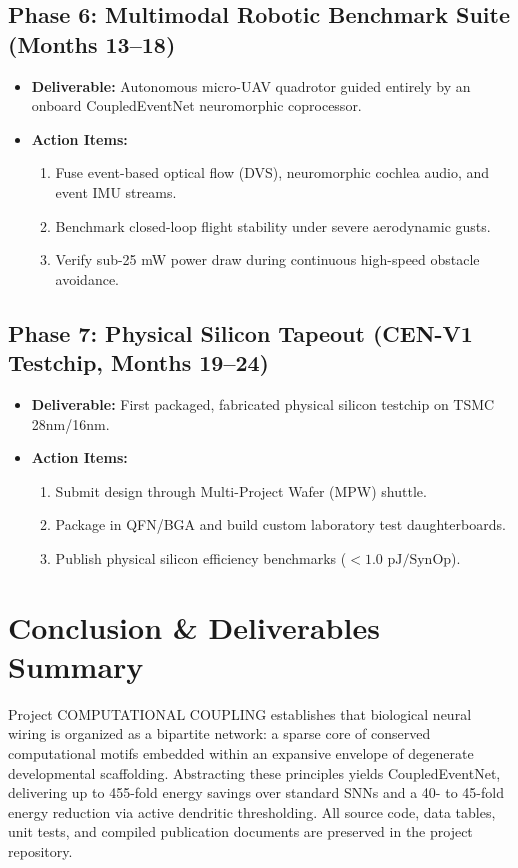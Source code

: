 \documentclass[11pt,letterpaper]{report}
\begin{document}
\section{Phase 6: Multimodal Robotic Benchmark Suite (Months 13--18)}
\begin{itemize}[leftmargin=*]
    \item \textbf{Deliverable:} Autonomous micro-UAV quadrotor guided entirely by an onboard CoupledEventNet neuromorphic coprocessor.
    \item \textbf{Action Items:}
        \begin{enumerate}
            \item Fuse event-based optical flow (DVS), neuromorphic cochlea audio, and event IMU streams.
            \item Benchmark closed-loop flight stability under severe aerodynamic gusts.
            \item Verify sub-25 mW power draw during continuous high-speed obstacle avoidance.
        \end{enumerate}
\end{itemize}

\section{Phase 7: Physical Silicon Tapeout (CEN-V1 Testchip, Months 19--24)}
\begin{itemize}[leftmargin=*]
    \item \textbf{Deliverable:} First packaged, fabricated physical silicon testchip on TSMC 28nm/16nm.
    \item \textbf{Action Items:}
        \begin{enumerate}
            \item Submit design through Multi-Project Wafer (MPW) shuttle.
            \item Package in QFN/BGA and build custom laboratory test daughterboards.
            \item Publish physical silicon efficiency benchmarks ($<1.0\text{ pJ/SynOp}$).
        \end{enumerate}
\end{itemize}

\chapter{Conclusion \& Deliverables Summary}
Project COMPUTATIONAL COUPLING establishes that biological neural wiring is organized as a bipartite network: a sparse core of conserved computational motifs embedded within an expansive envelope of degenerate developmental scaffolding. Abstracting these principles yields CoupledEventNet, delivering up to 455-fold energy savings over standard SNNs and a 40- to 45-fold energy reduction via active dendritic thresholding. All source code, data tables, unit tests, and compiled publication documents are preserved in the project repository.



\end{document}
